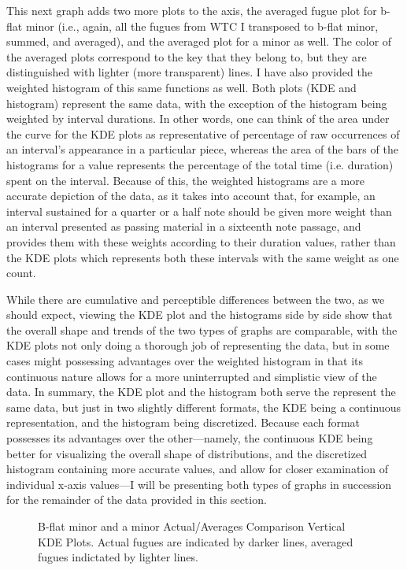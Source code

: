 This next graph adds two more plots to the axis, the averaged fugue plot
for b-flat minor (i.e., again, all the fugues from WTC I transposed to
b-flat minor, summed, and averaged), and the averaged plot for a minor
as well. The color of the averaged plots correspond to the key that they
belong to, but they are distinguished with lighter (more transparent)
lines. I have also provided the weighted histogram of this same
functions as well. Both plots (KDE and histogram) represent the same
data, with the exception of the histogram being weighted by interval
durations. In other words, one can think of the area under the curve for
the KDE plots as representative of percentage of raw occurrences of an
interval's appearance in a particular piece, whereas the area of the
bars of the histograms for a value represents the percentage of the
total time (i.e. duration) spent on the interval. Because of this, the
weighted histograms are a more accurate depiction of the data, as it
takes into account that, for example, an interval sustained for a
quarter or a half note should be given more weight than an interval
presented as passing material in a sixteenth note passage, and provides
them with these weights according to their duration values, rather than
the KDE plots which represents both these intervals with the same weight
as one count.

While there are cumulative and perceptible differences between the two,
as we should expect, viewing the KDE plot and the histograms side by
side show that the overall shape and trends of the two types of graphs
are comparable, with the KDE plots not only doing a thorough job of
representing the data, but in some cases might possessing advantages
over the weighted histogram in that its continuous nature allows for a
more uninterrupted and simplistic view of the data. In summary, the KDE
plot and the histogram both serve the represent the same data, but just
in two slightly different formats, the KDE being a continuous
representation, and the histogram being discretized. Because each format
possesses its advantages over the other---namely, the continuous KDE
being better for visualizing the overall shape of distributions, and the
discretized histogram containing more accurate values, and allow for
closer examination of individual x-axis values---I will be
presenting both types of graphs in succession for the remainder of the
data provided in this section.




\begin{figure}[H]
\vspace{1.5em}
    \centering
    \caption[B-flat minor and a minor Actual/Averages Comparison Vertical KDE Plots. ]{B-flat minor and a minor Actual/Averages Comparison Vertical KDE Plots. Actual fugues are indicated by darker lines, averaged fugues indictated by lighter lines.}
\end{figure}


